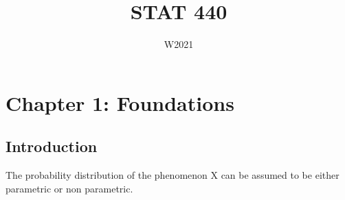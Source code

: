 \documentclass[12pt, oneside]{article}
\title{STAT 440}
\date{W2021}
\begin{document}
\maketitle

\newpage

\tableofcontents

\newpage

\section{Chapter 1: Foundations}

\subsection{Introduction}
The probability distribution of the phenomenon X can be assumed to be either parametric or non parametric.\\
\end{document}
